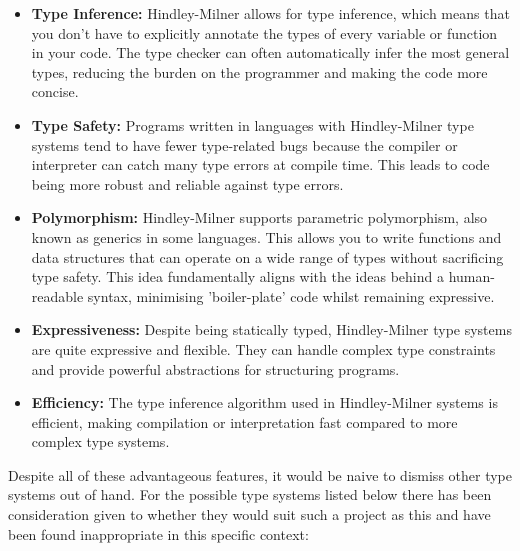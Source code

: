 \documentclass{l4proj}
\begin{document}
\begin{itemize}
    \item \textbf{Type Inference:} Hindley-Milner allows for type inference, which means that you don't have to explicitly annotate the types of every variable or function in your code.
    The type checker can often automatically infer the most general types, reducing the burden on the programmer and making the code more concise.
    \item \textbf{Type Safety:} Programs written in languages with Hindley-Milner type systems tend to have fewer type-related bugs because the compiler or interpreter can catch many type errors at compile time.
    This leads to code being more robust and reliable against type errors.
    \item \textbf{Polymorphism:} Hindley-Milner supports parametric polymorphism, also known as generics in some languages.
    This allows you to write functions and data structures that can operate on a wide range of types without sacrificing type safety.
    This idea fundamentally aligns with the ideas behind a human-readable syntax, minimising 'boiler-plate' code whilst remaining expressive.
    \item \textbf{Expressiveness:} Despite being statically typed, Hindley-Milner type systems are quite expressive and flexible.
    They can handle complex type constraints and provide powerful abstractions for structuring programs.
    \item \textbf{Efficiency:} The type inference algorithm used in Hindley-Milner systems is efficient, making compilation or interpretation fast compared to more complex type systems.
\end{itemize}


Despite all of these advantageous features, it would be naive to dismiss other type systems out of hand.
For the possible type systems listed below there has been consideration given to whether they would suit such a project as this and have been found inappropriate in this specific context:
\end{document}
